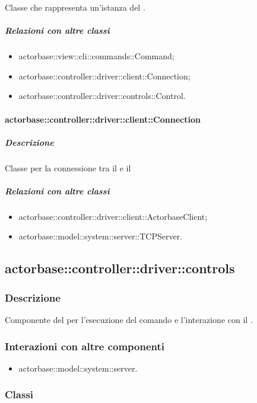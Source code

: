\documentclass{scalatekids-article}
\begin{document}
Classe che rappresenta un'istanza del .

\subparagraph{Relazioni con altre classi}

\begin{itemize}
\item actorbase::view::cli::commands::Command;
\item actorbase::controller::driver::client::Connection;
\item actorbase::controller::driver::controls::Control.
\end{itemize}

\paragraph{actorbase::controller::driver::client::Connection}

\subparagraph{Descrizione}

Classe per la connessione tra il  e il 

\subparagraph{Relazioni con altre classi}
\begin{itemize}
\item actorbase::controller::driver::client::ActorbaseClient;
\item actorbase::model::system::server::TCPServer.
\end{itemize}

\subsection{actorbase::controller::driver::controls}

\subsubsection{Descrizione}

Componente del  per l'esecuzione del comando e l'interazione con il .

\subsubsection{Interazioni con altre componenti}

\begin{itemize}
\item actorbase::model::system::server.
\end{itemize}

\subsubsection{Classi}
\end{document}

